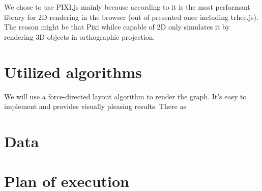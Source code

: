 We chose to use PIXI.js mainly because according to  it is the most performant library for 2D rendering in the browser
(out of presented onec including trhee.js).
The reason might be that Pixi whilce capable of 2D only simulates it by rendering 3D objects in orthographic projection.


\section{Utilized algorithms}

We will use a force-directed layout algorithm to render the graph. It's easy to implement and provides visually pleasing results.
There as 


\section{Data}

\section{Plan of execution}
